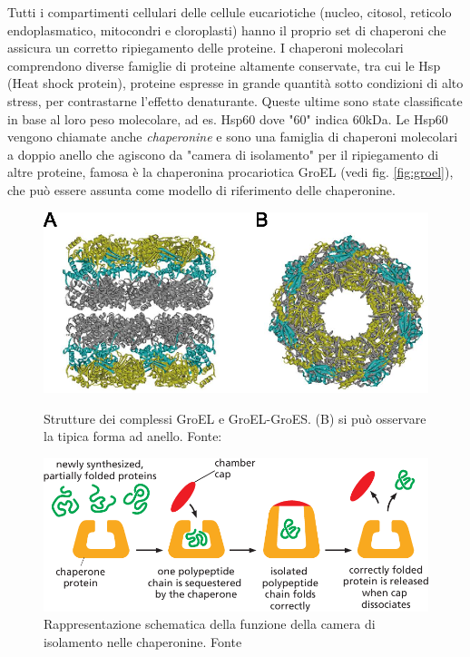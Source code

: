 Tutti i compartimenti cellulari delle cellule eucariotiche (nucleo, citosol, reticolo endoplasmatico, mitocondri e cloroplasti) hanno il proprio set di chaperoni che assicura un corretto ripiegamento delle proteine. I chaperoni molecolari comprendono diverse famiglie di proteine altamente conservate, tra cui le Hsp (Heat shock protein), proteine espresse in grande quantità sotto condizioni di alto stress, per contrastarne l'effetto denaturante. Queste ultime sono state classificate in base al loro peso molecolare, ad es. Hsp60 dove "60" indica 60kDa. Le Hsp60 vengono chiamate anche \textit{chaperonine} e sono una famiglia di chaperoni molecolari a doppio anello che agiscono da "camera di isolamento" per il ripiegamento di altre proteine\supercite{ranson1998chaperonins}, famosa è la chaperonina procariotica GroEL (vedi fig. \ref{fig:groel}), che può essere assunta come modello di riferimento delle chaperonine. 

\begin{figure}[h]
	
\end{figure}

\begin{figure}[!htb]
	\includegraphics[scale=0.25]{images/groel.png}
	\caption{Strutture dei complessi GroEL e GroEL-GroES. (B) si può osservare la tipica forma ad anello. Fonte: \cite{Iizuka2016ChaperoninGU}}
	\label{fig:groel}
	\endminipage\hfill
	\centering
	\includegraphics[scale=0.4]{images/chaperone-alberts-isolation.png}
	\caption{Rappresentazione schematica della funzione della camera di isolamento nelle chaperonine. Fonte \cite{alberts2018essential}}
	\label{fig:chaperone-camera}
	\endminipage\hfill
\end{figure}

